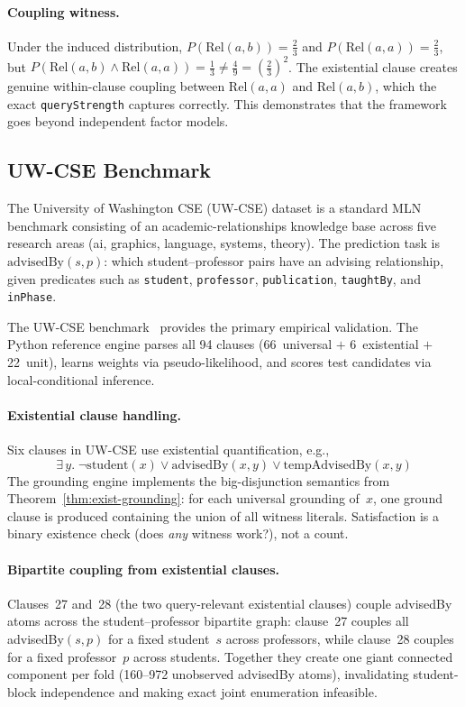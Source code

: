 \documentclass[11pt,openany]{report}
\begin{document}
\paragraph{Coupling witness.}
Under the induced distribution, $P(\mathrm{Rel}(a,b)) = \tfrac{2}{3}$
and $P(\mathrm{Rel}(a,a)) = \tfrac{2}{3}$, but
$P(\mathrm{Rel}(a,b) \land \mathrm{Rel}(a,a)) = \tfrac{1}{3}
  \neq \tfrac{4}{9} = (\tfrac{2}{3})^2$.
The existential clause creates genuine within-clause coupling between
$\mathrm{Rel}(a,a)$ and $\mathrm{Rel}(a,b)$, which the exact
\texttt{queryStrength} captures correctly.  This demonstrates that the
framework goes beyond independent factor models.

\subsection{UW-CSE Benchmark}
\label{sec:uwcse-benchmark}

The University of Washington CSE (UW-CSE) dataset is a standard MLN
benchmark consisting of an academic-relationships knowledge base across
five research areas (ai, graphics, language, systems, theory).  The
prediction task is $\mathrm{advisedBy}(s, p)$: which student--professor
pairs have an advising relationship, given predicates such as
\texttt{student}, \texttt{professor}, \texttt{publication},
\texttt{taughtBy}, and \texttt{inPhase}.

The UW-CSE benchmark~\cite{richardson2006markov} provides the primary
empirical validation.  The Python reference engine parses all 94 clauses
(66~universal $+$ 6~existential $+$ 22~unit), learns weights via
pseudo-likelihood, and scores test candidates via local-conditional
inference.

\paragraph{Existential clause handling.}
Six clauses in UW-CSE use existential quantification, e.g.,
\[
  \exists\, y.\; \neg\mathrm{student}(x) \lor
    \mathrm{advisedBy}(x, y) \lor \mathrm{tempAdvisedBy}(x, y)
\]
The grounding engine implements the big-disjunction semantics from
Theorem~\ref{thm:exist-grounding}: for each universal grounding of~$x$,
one ground clause is produced containing the union of all witness
literals.  Satisfaction is a binary existence check (does \emph{any}
witness work?), not a count.

\paragraph{Bipartite coupling from existential clauses.}
Clauses~27 and~28 (the two query-relevant existential clauses) couple
advisedBy atoms across the student--professor bipartite graph:
clause~27 couples all advisedBy$(s, p)$ for a fixed student~$s$ across
professors, while clause~28 couples for a fixed professor~$p$ across
students.  Together they create one giant connected component per fold
(160--972 unobserved advisedBy atoms), invalidating student-block
independence and making exact joint enumeration infeasible.
\end{document}
